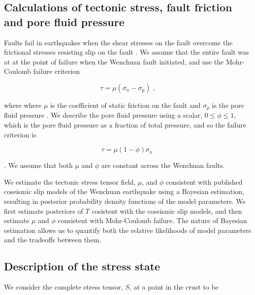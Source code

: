 \documentclass[twocolumn,jgrga]{AGUTeX}
\begin{document}
\begin{article}
\section{Calculations of tectonic stress, fault friction and pore fluid
pressure}\label{calculations-of-tectonic-stress-fault-friction-and-pore-fluid-pressure}

Faults fail in earthquakes when the shear stresses on the fault overcome
the frictional stresses resisting slip on the fault \citep[e.g.,][]
{scholz2002}. We assume that the entire fault was at at the point of
failure when the Wenchuan fault initiated, and use the Mohr-Coulomb
failure criterion

\begin{equation} 
\tau = \mu ( \sigma_n - \sigma_p ) \; ,
\label{eqn:amonton_raw} 
\end{equation}

where where $\mu$ is the coefficient of static friction on the fault and
$\sigma_p$ is the pore fluid pressure \citep[e.g.,][]{sibson1985}. We
describe the pore fluid pressure using a scalar, $0 \leq \phi \leq 1$,
which is the pore fluid pressure as a fraction of total pressure, and so
the failure criterion is

\begin{equation} 
\tau = \mu (1 - \phi) \sigma_n \; 
\label{eqn:amonton} 
\end{equation}

\citep[e.g.,][]{sibson1985}. We assume that both $\mu$ and $\phi$ are
constant across the Wenchuan faults.

We estimate the tectonic stress tensor field, $\mu$, and $\phi$
consistent with published coseismic slip models of the Wenchuan
earthquake using a Bayesian estimation, resulting in posterior probability 
density functions of the model parameters. 
We first estimate posteriors of $T$ cosistent with
the coseismic slip models, and then estimate $\mu$ and $\phi$ consistent
with Mohr-Coulomb failure. The nature of Bayesian estimation allows us
to quantify both the relative likelihoods of model parameters and the
tradeoffs between them.

\subsection{Description of the stress
state}\label{description-of-the-stress-state}

We consider the complete stress tensor, $S$, at a point in the crust to
be


\end{article}
\end{document}

